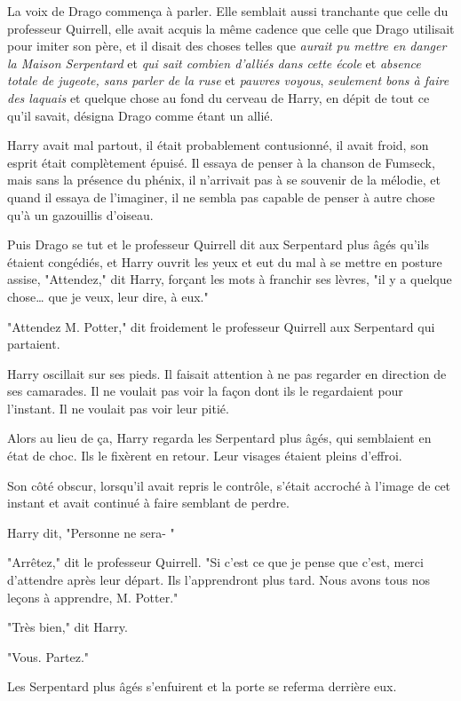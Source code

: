 La voix de Drago commença à parler. Elle semblait aussi tranchante que celle du professeur Quirrell, elle avait acquis la même cadence que celle que Drago utilisait pour imiter son père, et il disait des choses telles que \emph{aurait pu mettre en danger la Maison Serpentard} et \emph{qui sait combien d'alliés dans cette école} et \emph{absence totale de jugeote, sans parler de la ruse} et \emph{pauvres voyous}, \emph{seulement bons à faire des laquais} et quelque chose au fond du cerveau de Harry, en dépit de tout ce qu'il savait, désigna Drago comme étant un allié.

Harry avait mal partout, il était probablement contusionné, il avait froid, son esprit était complètement épuisé. Il essaya de penser à la chanson de Fumseck, mais sans la présence du phénix, il n'arrivait pas à se souvenir de la mélodie, et quand il essaya de l'imaginer, il ne sembla pas capable de penser à autre chose qu'à un gazouillis d'oiseau.

Puis Drago se tut et le professeur Quirrell dit aux Serpentard plus âgés qu'ils étaient congédiés, et Harry ouvrit les yeux et eut du mal à se mettre en posture assise, "Attendez," dit Harry, forçant les mots à franchir ses lèvres, "il y a quelque chose… que je veux, leur dire, à eux."

"Attendez M. Potter," dit froidement le professeur Quirrell aux Serpentard qui partaient.

Harry oscillait sur ses pieds. Il faisait attention à ne pas regarder en direction de ses camarades. Il ne voulait pas voir la façon dont ils le regardaient pour l'instant. Il ne voulait pas voir leur pitié.

Alors au lieu de ça, Harry regarda les Serpentard plus âgés, qui semblaient en état de choc. Ils le fixèrent en retour. Leur visages étaient pleins d'effroi.

Son côté obscur, lorsqu'il avait repris le contrôle, s'était accroché à l'image de cet instant et avait continué à faire semblant de perdre.

Harry dit, "Personne ne sera- "

"Arrêtez," dit le professeur Quirrell. "Si c'est ce que je pense que c'est, merci d'attendre après leur départ. Ils l'apprendront plus tard. Nous avons tous nos leçons à apprendre, M. Potter."

"Très bien," dit Harry.

"Vous. Partez."

Les Serpentard plus âgés s'enfuirent et la porte se referma derrière eux.

